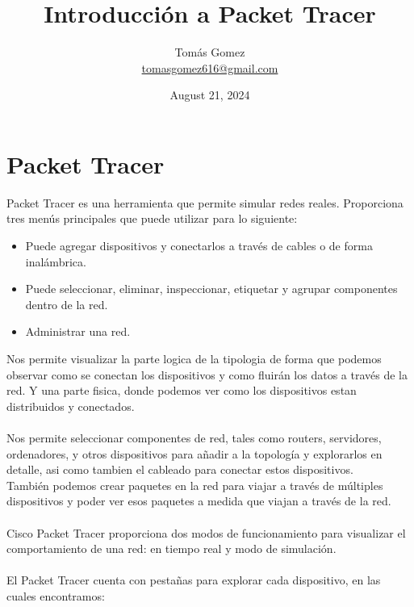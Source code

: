 \documentclass{article}
\title{Introducción a Packet Tracer}
\author{Tomás Gomez

\href{mailto:tomasgomez616@gmail.com}{tomasgomez616@gmail.com}}
\date{August 21, 2024}
\begin{document}
\maketitle


\section{Packet Tracer}

Packet Tracer es una herramienta que permite simular redes reales. 
Proporciona tres menús principales que puede utilizar para lo siguiente:
    \begin{itemize}
        \item Puede agregar dispositivos y conectarlos a través de cables o de forma inalámbrica.
        \item Puede seleccionar, eliminar, inspeccionar, etiquetar y agrupar componentes dentro de la red.
        \item Administrar una red.
    \end{itemize}
Nos permite visualizar la parte logica de la tipologia de forma que podemos observar como se conectan los dispositivos y como fluirán los datos a través de la red.
Y una parte fisica, donde podemos ver como los dispositivos estan distribuidos y conectados.
\\ \\
Nos permite seleccionar componentes de red, tales como routers, servidores, ordenadores, y otros dispositivos para añadir a la topología y explorarlos en detalle, asi como tambien el cableado para conectar estos dispositivos.
\\
También podemos crear paquetes en la red para viajar a través de múltiples dispositivos y poder ver esos paquetes a medida que viajan a través de la red.
\\ \\
Cisco Packet Tracer proporciona dos modos de funcionamiento para visualizar el comportamiento de una red: en tiempo real y modo de simulación.
\\
\\
El Packet Tracer cuenta con pestañas para explorar cada dispositivo, en las cuales encontramos:
\end{document}
